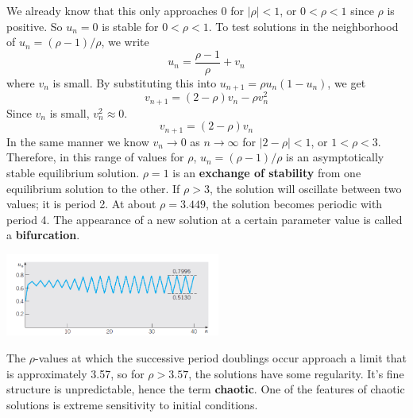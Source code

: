     We already know that this only approaches 0 for $|\rho| < 1$, or $0 < \rho < 1$ since $\rho$ is positive. So $u_n = 0$ is stable for $0 < \rho < 1$.
    \newline \indent
    To test solutions in the neighborhood of $u_n = (\rho - 1) / \rho$, we write
    \begin{equation*}
        u_n = \frac{\rho - 1}{\rho} + v_n
    \end{equation*}
    where $v_n$ is small. By substituting this into $u_{n+1} = \rho u_n (1 - u_n)$, we get
    \begin{equation*}
        v_{n+1} = (2 - \rho) v_n - \rho v_n^2
    \end{equation*}
    Since $v_n$ is small, $v_n^2 \approx 0$.
    \begin{equation*}
        v_{n+1} = (2 - \rho) v_n
    \end{equation*}
    In the same manner we know $v_n \rightarrow 0$ as $n \rightarrow \infty$ for $|2 - \rho| < 1$, or $1 < \rho < 3$. Therefore, in this range of values for $\rho$, $u_n = (\rho - 1) / \rho$ is an asymptotically stable equilibrium solution. $\rho = 1$ is an \textbf{exchange of stability} from one equilibrium solution to the other.
    \newline \indent
    If $\rho > 3$, the solution will oscillate between two values; it is period 2. At about $\rho = 3.449$, the solution becomes periodic with period 4. The appearance of a new solution at a certain parameter value is called a \textbf{bifurcation}.
    \begin{center}
        \includegraphics[width=200pt]{period.png}
    \end{center}
    \indent
    The $\rho$-values at which the successive period doublings occur approach a limit that is approximately 3.57, so for $\rho > 3.57$, the solutions have some regularity. It's fine structure is unpredictable, hence the term \textbf{chaotic}. One of the features of chaotic solutions is extreme sensitivity to initial conditions.
